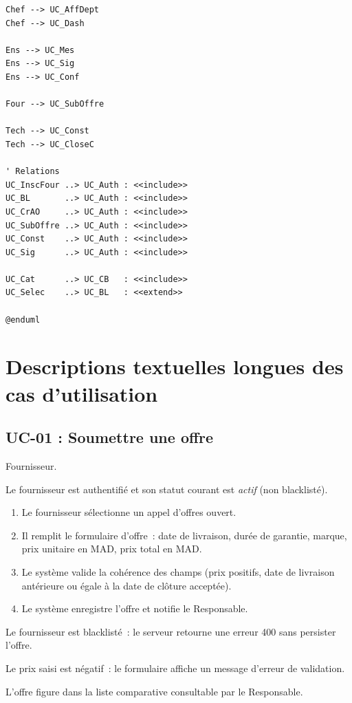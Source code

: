 \documentclass[a4paper,11pt,openany]{report}
\newcommand{\mad}{MAD}
\begin{document}
\begin{lstlisting}[caption={Diagramme UML --- Cas d'utilisation global},
                   label={lst:umlUseCase}]
Chef --> UC_AffDept
Chef --> UC_Dash

Ens --> UC_Mes
Ens --> UC_Sig
Ens --> UC_Conf

Four --> UC_SubOffre

Tech --> UC_Const
Tech --> UC_CloseC

' Relations
UC_InscFour ..> UC_Auth : <<include>>
UC_BL       ..> UC_Auth : <<include>>
UC_CrAO     ..> UC_Auth : <<include>>
UC_SubOffre ..> UC_Auth : <<include>>
UC_Const    ..> UC_Auth : <<include>>
UC_Sig      ..> UC_Auth : <<include>>

UC_Cat      ..> UC_CB   : <<include>>
UC_Selec    ..> UC_BL   : <<extend>>

@enduml
\end{lstlisting}

\section{Descriptions textuelles longues des cas d'utilisation}

\subsection{UC-01 : Soumettre une offre}
\begin{description}[leftmargin=*]
  \item[Acteur principal] Fournisseur.
  \item[Précondition] Le fournisseur est authentifié et son
    statut courant est \emph{actif} (non blacklisté).
  \item[Scénario nominal]
    \begin{enumerate}
      \item Le fournisseur sélectionne un appel d'offres ouvert.
      \item Il remplit le formulaire d'offre~: date de
        livraison, durée de garantie, marque, prix unitaire en
        \mad, prix total en \mad.
      \item Le système valide la cohérence des champs (prix
        positifs, date de livraison antérieure ou égale à la
        date de clôture acceptée).
      \item Le système enregistre l'offre et notifie le
        Responsable.
    \end{enumerate}
  \item[Scénario alternatif A1] Le fournisseur est blacklisté~:
    le serveur retourne une erreur 400 sans persister l'offre.
  \item[Scénario alternatif A2] Le prix saisi est négatif~: le
    formulaire affiche un message d'erreur de validation.
  \item[Postcondition] L'offre figure dans la liste comparative
    consultable par le Responsable.
\end{description}
\end{document}
